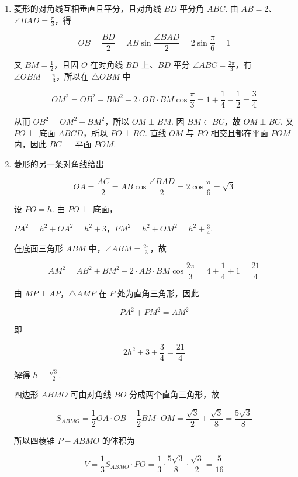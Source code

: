 \begin{solution}
\begin{enumerate}
\item 菱形的对角线互相垂直且平分，且对角线 \(BD\) 平分角 \(ABC\). 由 \(AB=2\)、\(\angle BAD=\frac\pi3\)，得

\[
OB=\frac{BD}{2}=AB\sin\frac{\angle BAD}{2}
=2\sin\frac\pi6=1
\]

又 \(BM=\frac12\)，且因 \(O\) 在对角线 \(BD\) 上、\(BD\) 平分 \(\angle ABC=\frac{2\pi}{3}\)，有 \(\angle OBM=\frac\pi3\)，所以在 \(\triangle OBM\) 中

\[
OM^2=OB^2+BM^2-2\cdot OB\cdot BM\cos\frac\pi3
=1+\frac14-\frac12=\frac34
\]

从而 \(OB^2=OM^2+BM^2\)，所以 \(OM\perp BM\). 因 \(BM\subset BC\)，故 \(OM\perp BC\). 又 \(PO\perp\) 底面 \(ABCD\)，所以 \(PO\perp BC\). 直线 \(OM\) 与 \(PO\) 相交且都在平面 \(POM\) 内，因此 \(BC\perp\) 平面 \(POM\).

\item 菱形的另一条对角线给出

\[
OA=\frac{AC}{2}=AB\cos\frac{\angle BAD}{2}
=2\cos\frac\pi6=\sqrt3
\]

设 \(PO=h\). 由 \(PO\perp\) 底面，

\(PA^2=h^2+OA^2=h^2+3\)，\(PM^2=h^2+OM^2=h^2+\frac34\).

在底面三角形 \(ABM\) 中，\(\angle ABM=\frac{2\pi}{3}\)，故

\[
AM^2=AB^2+BM^2-2\cdot AB\cdot BM\cos\frac{2\pi}{3}
=4+\frac14+1=\frac{21}{4}
\]

由 \(MP\perp AP\)，\(\triangle AMP\) 在 \(P\) 处为直角三角形，因此

\[
PA^2+PM^2=AM^2
\]

即

\[
2h^2+3+\frac34=\frac{21}{4}
\]

解得 \(h=\frac{\sqrt3}{2}\).

四边形 \(ABMO\) 可由对角线 \(BO\) 分成两个直角三角形，故

\[
S_{ABMO}=\frac12OA\cdot OB+\frac12BM\cdot OM
=\frac{\sqrt3}{2}+\frac{\sqrt3}{8}
=\frac{5\sqrt3}{8}
\]

所以四棱锥 \(P-ABMO\) 的体积为

\[
V=\frac13S_{ABMO}\cdot PO
=\frac13\cdot\frac{5\sqrt3}{8}\cdot\frac{\sqrt3}{2}
=\frac5{16}
\]
\end{enumerate}
\end{solution}

